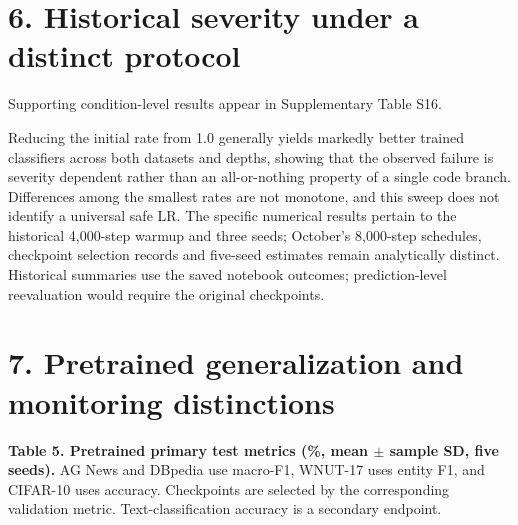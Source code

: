\documentclass[smallextended]{svjour3}
\begin{document}
\section{6. Historical severity under a distinct protocol}\label{historical-severity-under-a-distinct-protocol}

Supporting condition-level results appear in Supplementary Table S16.

Reducing the initial rate from 1.0 generally yields markedly better trained classifiers across both datasets and depths, showing that the observed failure is severity dependent rather than an all-or-nothing property of a single code branch. Differences among the smallest rates are not monotone, and this sweep does not identify a universal safe LR. The specific numerical results pertain to the historical 4,000-step warmup and three seeds; October's 8,000-step schedules, checkpoint selection records and five-seed estimates remain analytically distinct. Historical summaries use the saved notebook outcomes; prediction-level reevaluation would require the original checkpoints.


\section{7. Pretrained generalization and monitoring distinctions}\label{pretrained-generalization-and-monitoring-distinctions}


\textbf{Table 5. Pretrained primary test metrics (\%, mean \(\pm\) sample SD, five seeds).} AG News and DBpedia use macro-F1, WNUT-17 uses entity F1, and CIFAR-10 uses accuracy. Checkpoints are selected by the corresponding validation metric. Text-classification accuracy is a secondary endpoint.
\end{document}
